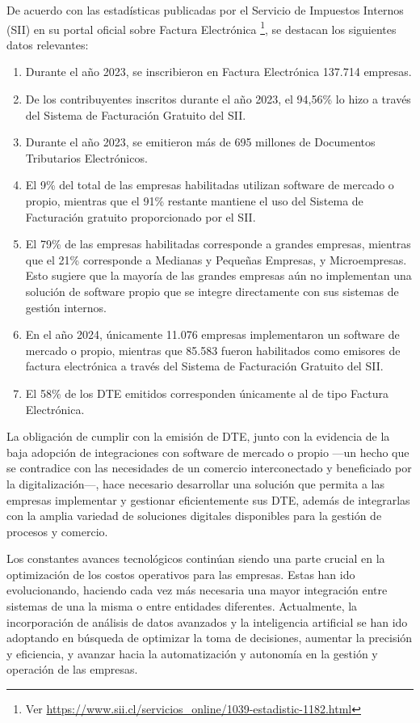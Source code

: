 De acuerdo con las estadísticas publicadas por el Servicio de Impuestos Internos (SII) en su portal oficial sobre Factura Electrónica \textcite{estadisticasFacturaElectronica} \footnote{Ver \url{https://www.sii.cl/servicios_online/1039-estadistic-1182.html}}, se destacan los siguientes datos relevantes:
\begin{enumerate}
	\item Durante el año 2023, se inscribieron en Factura Electrónica 137.714 empresas.
	\item De los contribuyentes inscritos durante el año 2023, el 94,56\% lo hizo a través del Sistema de Facturación Gratuito del SII.
	\item Durante el año 2023, se emitieron más de 695 millones de Documentos Tributarios Electrónicos.
	\item El 9\% del total de las empresas habilitadas utilizan software de mercado o propio, mientras que el 91\% restante mantiene el uso del Sistema de Facturación gratuito proporcionado por el SII.
	\item El 79\% de las empresas habilitadas corresponde a grandes empresas, mientras que el 21\% corresponde a Medianas y Pequeñas Empresas, y Microempresas. Esto sugiere que la mayoría de las grandes empresas aún no implementan una solución de software propio que se integre directamente con sus sistemas de gestión internos.
	\item En el año 2024, únicamente 11.076 empresas implementaron un software de mercado o propio, mientras que 85.583 fueron habilitados como emisores de factura electrónica a través del Sistema de Facturación Gratuito del SII.
	\item El 58\% de los DTE emitidos corresponden únicamente al de tipo Factura Electrónica.
\end{enumerate}

La obligación de cumplir con la emisión de DTE, junto con la evidencia de la baja adopción de integraciones con software de mercado o propio —un hecho que se contradice con las necesidades de un comercio interconectado y beneficiado por la digitalización—, hace necesario desarrollar una solución que permita a las empresas implementar y gestionar eficientemente sus DTE, además de integrarlas con la amplia variedad de soluciones digitales disponibles para la gestión de procesos y comercio.

Los constantes avances tecnológicos continúan siendo una parte crucial en la optimización de los costos operativos para las empresas. Estas han ido evolucionando, haciendo cada vez más necesaria una mayor integración entre sistemas de una la misma o entre entidades diferentes. Actualmente, la incorporación de análisis de datos avanzados y la inteligencia artificial se han ido adoptando en búsqueda de optimizar la toma de decisiones, aumentar la precisión y eficiencia, y avanzar hacia la automatización y autonomía en la gestión y operación de las empresas.

